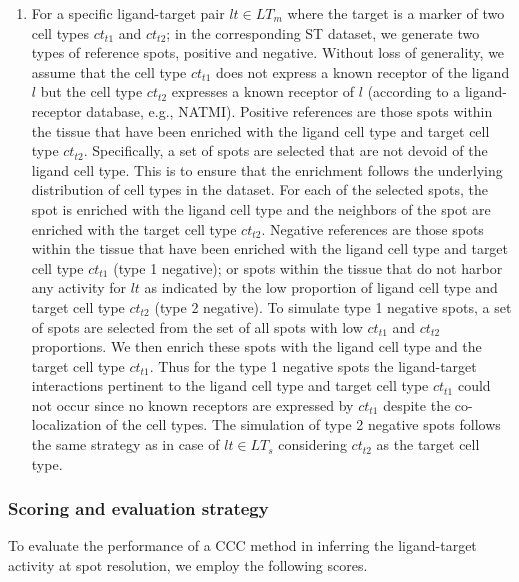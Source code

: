 \begin{enumerate}
    \item For a specific ligand-target pair $lt \in LT_{m}$ where the target is a marker of two cell types $ct_{t1}$ and $ct_{t2}$; in the corresponding ST dataset, we generate two types of reference spots, positive and negative. Without loss of generality, we assume that the cell type $ct_{t1}$ does not express a known receptor of the ligand $l$ but the cell type $ct_{t2}$ expresses a known receptor of $l$ (according to a ligand-receptor database, e.g., NATMI). Positive references are those spots within the tissue that have been enriched with the ligand cell type and target cell type $ct_{t2}$. Specifically, a set of spots are selected that are not devoid of the ligand cell type. This is to ensure that the enrichment follows the underlying distribution of cell types in the dataset. For each of the selected spots, the spot is enriched with the ligand cell type and the neighbors of the spot are enriched with the target cell type $ct_{t2}$. Negative references are those spots within the tissue that have been enriched with the ligand cell type and target cell type $ct_{t1}$ (type 1 negative); or spots within the tissue that do not harbor any activity for $lt$ as indicated by the low proportion of ligand cell type and target cell type $ct_{t2}$ (type 2 negative). To simulate type 1 negative spots, a set of spots are selected from the set of all spots with low $ct_{t1}$ and $ct_{t2}$ proportions. We then enrich these spots with the ligand cell type and the target cell type $ct_{t1}$. Thus for the type 1 negative spots the ligand-target interactions pertinent to the ligand cell type and target cell type $ct_{t1}$ could not occur since no known receptors are expressed by $ct_{t1}$ despite the co-localization of the cell types. The simulation of type 2 negative spots follows the same strategy as in case of $lt \in LT_{s}$ considering $ct_{t2}$ as the target cell type. 
    
\end{enumerate}

\subsubsection*{Scoring and evaluation strategy}
To evaluate the performance of a CCC method in inferring the ligand-target activity at spot resolution, we employ the following scores. 
